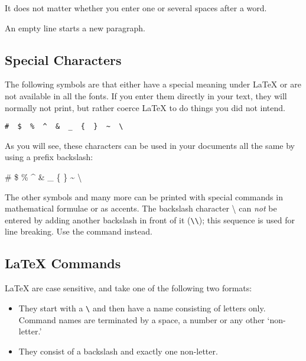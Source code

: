 \begin{example}
It does not matter whether you
enter one or several     spaces
after a word.

An empty line starts a new 
paragraph.
\end{example}
 
\subsection{Special Characters}

The following symbols are  that either have a
special meaning under \LaTeX{} or are not available in all the fonts.
If you enter them directly in your text, they will normally not print,
but rather coerce \LaTeX{} to do things you did not intend. 
\begin{code}
\verb.#  $  %  ^  &  _  {  }  ~  \ . %
\end{code}

As you will see, these characters can be used in your documents all
the same by using a prefix backslash:

\begin{example}
\# \$ \% \^{} \& \_ \{ \} \~{}
\textbackslash
\end{example}

The other symbols and many more can be printed with special commands
in mathematical formulae or as accents. The backslash character
\textbackslash{} can \emph{not} be entered by adding another backslash
in front of it (\verb|\\|); this sequence is used for
line breaking. Use the  command instead.

\subsection{\LaTeX{} Commands}

\LaTeX{}  are case sensitive, and take one of the following
two formats:

\begin{itemize}
\item They start with a  \verb|\| and then have a name
 consisting of letters only. Command names are terminated by a
 space, a number or any other `non-letter.'
\item They consist of a backslash and exactly one non-letter.
\end{itemize}

%
%

